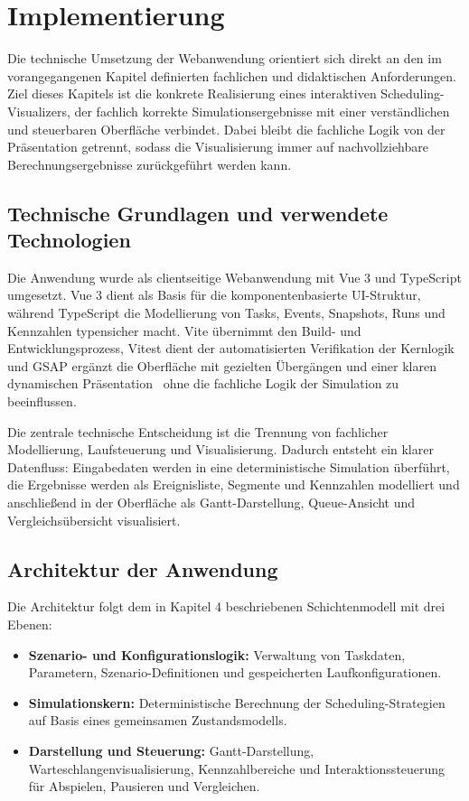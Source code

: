 \chapter{Implementierung}

Die technische Umsetzung der Webanwendung orientiert sich direkt an den im vorangegangenen Kapitel definierten fachlichen und didaktischen Anforderungen. Ziel dieses Kapitels ist die konkrete Realisierung eines interaktiven Scheduling-Visualizers, der fachlich korrekte Simulationsergebnisse mit einer verständlichen und steuerbaren Oberfläche verbindet. Dabei bleibt die fachliche Logik von der Präsentation getrennt, sodass die Visualisierung immer auf nachvollziehbare Berechnungsergebnisse zurückgeführt werden kann.

\section{Technische Grundlagen und verwendete Technologien}

Die Anwendung wurde als clientseitige Webanwendung mit Vue 3 und TypeScript umgesetzt. Vue 3 dient als Basis für die komponentenbasierte UI-Struktur, während TypeScript die Modellierung von Tasks, Events, Snapshots, Runs und Kennzahlen typensicher macht. Vite übernimmt den Build- und Entwicklungsprozess, Vitest dient der automatisierten Verifikation der Kernlogik und GSAP ergänzt die Oberfläche mit gezielten Übergängen und einer klaren dynamischen Präsentation \, ohne die fachliche Logik der Simulation zu beeinflussen.

Die zentrale technische Entscheidung ist die Trennung von fachlicher Modellierung, Laufsteuerung und Visualisierung. Dadurch entsteht ein klarer Datenfluss: Eingabedaten werden in eine deterministische Simulation überführt, die Ergebnisse werden als Ereignisliste, Segmente und Kennzahlen modelliert und anschließend in der Oberfläche als Gantt-Darstellung, Queue-Ansicht und Vergleichsübersicht visualisiert.

\section{Architektur der Anwendung}

Die Architektur folgt dem in Kapitel 4 beschriebenen Schichtenmodell mit drei Ebenen:

\begin{itemize}
    \item \textbf{Szenario- und Konfigurationslogik:} Verwaltung von Taskdaten, Parametern, Szenario-Definitionen und gespeicherten Laufkonfigurationen.
    \item \textbf{Simulationskern:} Deterministische Berechnung der Scheduling-Strategien auf Basis eines gemeinsamen Zustandsmodells.
    \item \textbf{Darstellung und Steuerung:} Gantt-Darstellung, Warteschlangenvisualisierung, Kennzahlbereiche und Interaktionssteuerung für Abspielen, Pausieren und Vergleichen.
\end{itemize}

